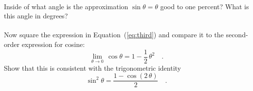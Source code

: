 \documentclass[12pt]{article}
\begin{document}
\paragraph{\theproblem}%
Inside of what angle is the approximation $\sin\theta=\theta$ good to
one percent?  What is this angle in degrees?

\paragraph{\theproblem}%
Now square the expression in Equation~(\ref{eq:third}) and compare it
to the second-order expression for cosine:
\begin{equation}
\lim_{\theta\rightarrow 0}\,\cos\theta=1-\frac{1}{2}\,\theta^2 \quad .
\end{equation}
Show that this is consistent with the trigonometric identity
\begin{equation}
\sin^2\theta = \frac{1 - \cos(2\,\theta)}{2} \quad .
\end{equation}
\end{document}
